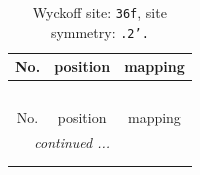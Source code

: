 \documentclass[fleqn,8pt]{jsarticle}
\begin{document}
\renewcommand{\arraystretch}{1.2}
\begin{longtable}{ccc}
\caption{Wyckoff site: {\tt 36f}, site symmetry: {\tt .2'.}}
 \\
 \hline \hline
No. & position & mapping \\ \hline \endfirsthead

\multicolumn{2}{l}{\tablename\ \thetable{}} \\
 \hline \hline
No. & position & mapping \\ \hline \endhead

 \hline \hline
\multicolumn{2}{r}{\footnotesize\it continued ...} \\ \endfoot

 \hline \hline
\multicolumn{2}{r}{} \\ \endlastfoot


\end{longtable}
\end{document}

